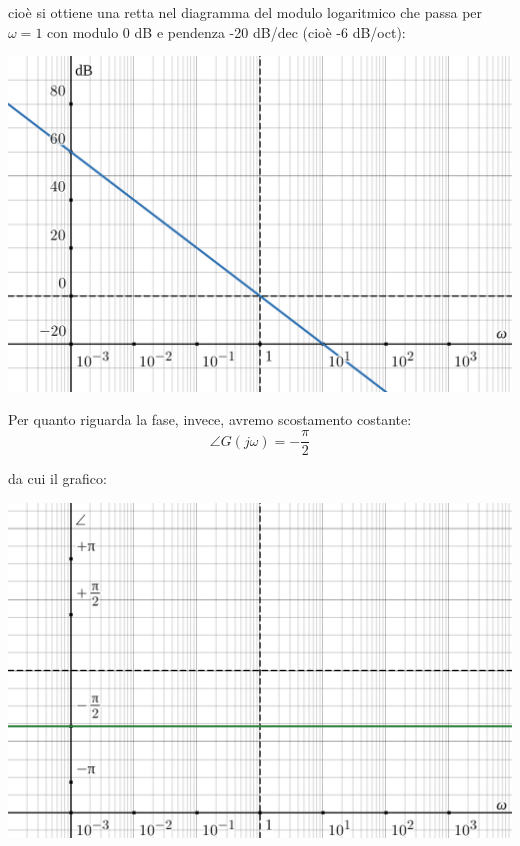 \documentclass[a4paper,11pt]{article}
\begin{document}
\noindent
\begin{minipage}{\textwidth}
cioè si ottiene una retta nel diagramma del modulo logaritmico che passa per $\omega =1$ con modulo 0 dB e pendenza -20 dB/dec (cioè -6 dB/oct):
\begin{center}
	\includegraphics[scale=0.3]{../figures/integrator_bode/mod.png}
\end{center}
\end{minipage}

\par\bigskip

Per quanto riguarda la fase, invece, avremo scostamento costante:
$$
\angle G(j \omega) = - \frac{\pi}{2}
$$

\par\bigskip

\noindent
\begin{minipage}{\textwidth}
da cui il grafico:
\begin{center}
	\includegraphics[scale=0.3]{../figures/integrator_bode/phase.png}
\end{center}
\end{minipage}
\end{document}
